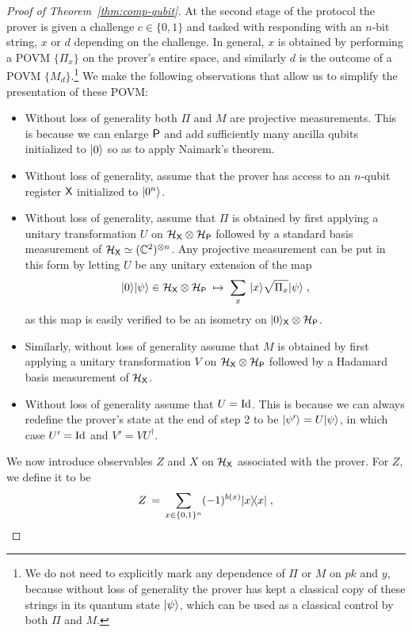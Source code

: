 \begin{proof}[Proof of Theorem~\ref{thm:comp-qubit}]
At the second stage of the protocol the prover is given a challenge $c\in\{0,1\}$ and tasked with responding with an $n$-bit string, $x$ or $d$ depending on the challenge. In general, $x$ is obtained by performing a POVM $\{\Pi_x\}$ on the prover's entire space, and similarly $d$ is the outcome of a POVM $\{M_d\}$.\footnote{We do not need to explicitly mark any dependence of $\Pi$ or $M$ on $pk$ and $y$, because without loss of generality the prover has kept a classical copy of these strings in its quantum state $|\psi\rangle$, which can be used as a classical control by both $\Pi$ and $M$.} We make the following observations that allow us to simplify the presentation of these POVM:
\begin{itemize}
\item Without loss of generality both $\Pi$ and $M$ are projective measurements. This is because we can enlarge ${\textsf{P}}$ and add sufficiently many ancilla qubits initialized to $|0\rangle$ so as to apply Naimark's theorem. 
\item Without loss of generality, assume that the prover has access to an $n$-qubit register ${\textsf{X}}$ initialized to $|0^n\rangle$. 
\item Without loss of generality, assume that $\Pi$ is obtained by first applying a unitary transformation $U$ on $\mathcal{H}_{\textsf{X}} \otimes \mathcal{H}_{{\textsf{P}}}$ followed by a standard basis measurement of $\mathcal{H}_{\textsf{X}}  \simeq (\mathbb{C}^2)^{\otimes n}$. Any projective measurement can be put in this form by letting $U$ be any unitary extension of the map 
\[|0\rangle|\psi\rangle\in \mathcal{H}_{\textsf{X}}\otimes \mathcal{H}_{\textsf{P}}\; \mapsto\; \sum_x \,|x\rangle \sqrt{\Pi_x} |\psi\rangle\;,\]
 as this map is easily verified to be an isometry on $|0\rangle_{\textsf{X}}\otimes \mathcal{H}_{\textsf{P}}$. 
\item Similarly, without loss of generality assume that $M$ is obtained by first applying a unitary transformation $V$ on $\mathcal{H}_{\textsf{X}} \otimes \mathcal{H}_{{\textsf{P}}}$ followed by a Hadamard basis measurement of $\mathcal{H}_{\textsf{X}}$.
\item Without loss of generality assume that $U = \mathop{\rm Id}\nolimits$. This is because we can always redefine the prover's state at the end of step 2 to be $|\psi'\rangle = U|\psi\rangle$, in which case $U'=\mathop{\rm Id}\nolimits$ and $V'=VU^\dagger$. 
\end{itemize}
We now introduce observables $Z$ and $X$ on $\mathcal{H}_{\textsf{X}}$ associated with the prover. For $Z$, we define it to be 
\begin{equation}\label{eq:comp-qubit-proof-1a}
Z \,=\, \sum_{x\in\{0,1\}^n} (-1)^{b(x)} |x\rangle\!\langle x|\;,
\end{equation}

\end{proof}
